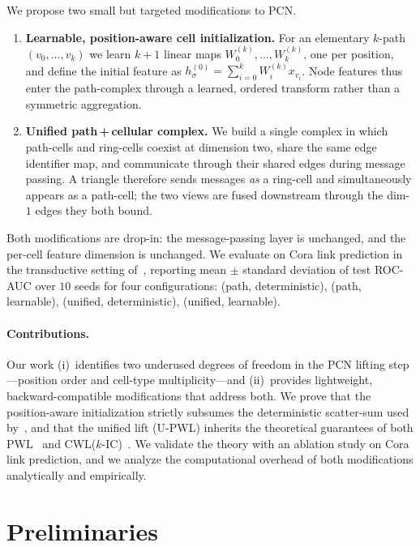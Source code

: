 \documentclass{article}
\begin{document}
We propose two small but targeted modifications to PCN.
\begin{enumerate}
  \item \textbf{Learnable, position-aware cell initialization.} For an elementary $k$-path $(v_0, \ldots, v_k)$ we learn $k + 1$ linear maps $W_0^{(k)}, \ldots, W_k^{(k)}$, one per position, and define the initial feature as $h_\sigma^{(0)} = \sum_{i=0}^{k} W_i^{(k)} x_{v_i}$. Node features thus enter the path-complex through a learned, ordered transform rather than a symmetric aggregation.
  \item \textbf{Unified path\,+\,cellular complex.} We build a single complex in which path-cells and ring-cells coexist at dimension two, share the same edge identifier map, and communicate through their shared edges during message passing. A triangle therefore sends messages \emph{as} a ring-cell and simultaneously appears as a path-cell; the two views are fused downstream through the dim-$1$ edges they both bound.
\end{enumerate}

Both modifications are drop-in: the message-passing layer is unchanged, and the per-cell feature dimension is unchanged. We evaluate on Cora link prediction in the transductive setting of~\citet{kipf_variational_2016}, reporting mean $\pm$ standard deviation of test ROC-AUC over $10$ seeds for four configurations: (path, deterministic), (path, learnable), (unified, deterministic), (unified, learnable).

\paragraph{Contributions.}
Our work (i)~identifies two underused degrees of freedom in the PCN lifting step---position order and cell-type multiplicity---and (ii)~provides lightweight, backward-compatible modifications that address both. We prove that the position-aware initialization strictly subsumes the deterministic scatter-sum used by~\citet{truong_weisfeiler_2024}, and that the unified lift (U-PWL) inherits the theoretical guarantees of both PWL~\citep{truong_weisfeiler_2024} and CWL($k$-IC)~\citep{bodnar_weisfeiler_2022}. We validate the theory with an ablation study on Cora link prediction, and we analyze the computational overhead of both modifications analytically and empirically.

\section{Preliminaries}
\label{section:prelim}
\end{document}

